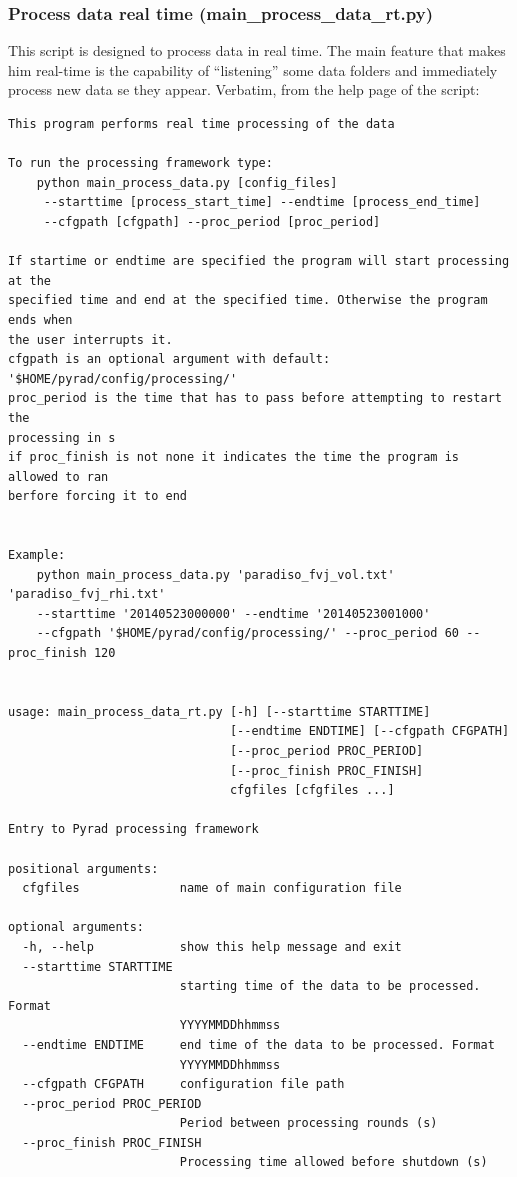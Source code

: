 \documentclass[a4paper,11pt,pdftex,twoside]{scrartcl}
\begin{document}
\subsubsection{Process data real time (main\_process\_data\_rt.py)}
This script is designed to process data in real time. The main feature that makes him real-time is the capability of ``listening'' some data folders and immediately process new data se they appear.
Verbatim, from the help page of the script:
\begin{verbatim}
This program performs real time processing of the data

To run the processing framework type:
    python main_process_data.py [config_files] 
     --starttime [process_start_time] --endtime [process_end_time] 
     --cfgpath [cfgpath] --proc_period [proc_period]

If startime or endtime are specified the program will start processing at the
specified time and end at the specified time. Otherwise the program ends when
the user interrupts it.
cfgpath is an optional argument with default: '$HOME/pyrad/config/processing/'
proc_period is the time that has to pass before attempting to restart the
processing in s
if proc_finish is not none it indicates the time the program is allowed to ran
berfore forcing it to end


Example:
    python main_process_data.py 'paradiso_fvj_vol.txt' 'paradiso_fvj_rhi.txt' 
    --starttime '20140523000000' --endtime '20140523001000' 
    --cfgpath '$HOME/pyrad/config/processing/' --proc_period 60 --proc_finish 120


usage: main_process_data_rt.py [-h] [--starttime STARTTIME]
                               [--endtime ENDTIME] [--cfgpath CFGPATH]
                               [--proc_period PROC_PERIOD]
                               [--proc_finish PROC_FINISH]
                               cfgfiles [cfgfiles ...]

Entry to Pyrad processing framework

positional arguments:
  cfgfiles              name of main configuration file

optional arguments:
  -h, --help            show this help message and exit
  --starttime STARTTIME
                        starting time of the data to be processed. Format
                        YYYYMMDDhhmmss
  --endtime ENDTIME     end time of the data to be processed. Format
                        YYYYMMDDhhmmss
  --cfgpath CFGPATH     configuration file path
  --proc_period PROC_PERIOD
                        Period between processing rounds (s)
  --proc_finish PROC_FINISH
                        Processing time allowed before shutdown (s)

\end{verbatim}
\end{document}
